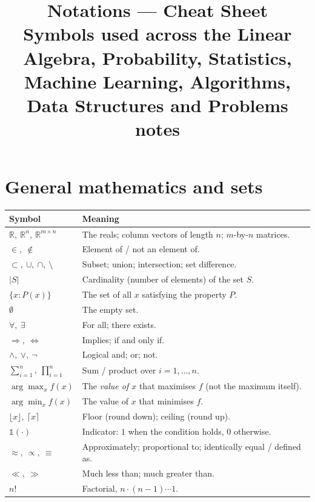 \documentclass[10pt,letterpaper,onecolumn]{article}
\title{\vspace{-2em}\textbf{Notations — Cheat Sheet}\\[0.3em]
       \large\normalfont Symbols used across the Linear Algebra, Probability,
       Statistics, Machine Learning, Algorithms, Data Structures and Problems
       notes}
\author{}
\date{}
\makeatletter
\newenvironment{symtab}
  {\begin{longtable}{@{}>{\raggedright\arraybackslash}p{0.26\textwidth}%
                       >{\raggedright\arraybackslash}p{0.70\textwidth}@{}}
   \toprule
   \textbf{Symbol} & \textbf{Meaning} \\
   \midrule
   \endhead
   \bottomrule
   \endfoot}
  {\end{longtable}}
\makeatother
\begin{document}
\maketitle
\thispagestyle{plain}
\vspace{-2em}

{\small
\tableofcontents
}

\vspace{1em}

\section{General mathematics and sets}

\begin{symtab}
$\mathbb{R},\ \mathbb{R}^{n},\ \mathbb{R}^{m\times n}$ & The reals; column vectors of length $n$; $m$-by-$n$ matrices. \\
$\in,\ \notin$ & Element of / not an element of. \\
$\subset,\ \cup,\ \cap,\ \setminus$ & Subset; union; intersection; set difference. \\
$|S|$ & Cardinality (number of elements) of the set $S$. \\
$\{x : P(x)\}$ & The set of all $x$ satisfying the property $P$. \\
$\emptyset$ & The empty set. \\
$\forall,\ \exists$ & For all; there exists. \\
$\Rightarrow,\ \iff$ & Implies; if and only if. \\
$\land,\ \lor,\ \lnot$ & Logical and; or; not. \\
$\sum_{i=1}^{n},\ \prod_{i=1}^{n}$ & Sum / product over $i = 1,\dots,n$. \\
$\arg\max_{x} f(x)$ & The \emph{value of $x$} that maximises $f$ (not the maximum itself). \\
$\arg\min_{x} f(x)$ & The value of $x$ that minimises $f$. \\
$\lfloor x \rfloor,\ \lceil x \rceil$ & Floor (round down); ceiling (round up). \\
$\mathbb{1}(\cdot)$ & Indicator: $1$ when the condition holds, $0$ otherwise. \\
$\approx,\ \propto,\ \equiv$ & Approximately; proportional to; identically equal / defined as. \\
$\ll,\ \gg$ & Much less than; much greater than. \\
$n!$ & Factorial, $n\cdot(n-1)\cdots 1$. \\

\end{symtab}
\end{document}
